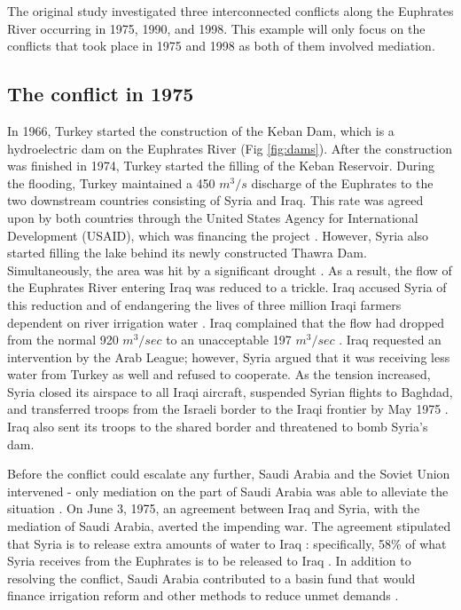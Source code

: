 \documentclass[letterpaper,12pt,titlepage,oneside,final]{book}
\begin{document}
The original study investigated three interconnected conflicts along the Euphrates River occurring in 1975, 1990, and 1998. This example will only focus on the conflicts that took place in 1975 and 1998 as both of them involved mediation. 

\subsection{The conflict in 1975}
In 1966, Turkey started the construction of the Keban Dam, which is a hydroelectric dam on the Euphrates River (Fig \ref{fig:dams}). After the construction was finished in 1974, Turkey started the filling of the Keban Reservoir. During the flooding, Turkey maintained a 450 $m^3/s$ discharge of the Euphrates to the two downstream countries consisting of Syria and Iraq. This rate was agreed upon by both countries through the United States Agency for International Development (USAID), which was financing the project \citep{inan2000law}. However, Syria also started filling the lake behind its newly constructed Thawra Dam. Simultaneously, the area was hit by a significant drought \citep{kalpakian2004identity}. As a result, the flow of the Euphrates River entering Iraq was reduced to a trickle. Iraq accused Syria of this reduction and of endangering the lives of three million Iraqi farmers dependent on river irrigation water \citep{morris1997water}. Iraq complained that the flow had dropped from the normal 920 $m^3/sec$ to an unacceptable 197 $m^3/sec$ \citep{priscoli2009managing}. Iraq requested an intervention by the Arab League; however, Syria argued that it was receiving less water from Turkey as well and refused to cooperate. As the tension increased, Syria closed its airspace to all Iraqi aircraft, suspended Syrian flights to Baghdad, and transferred troops from the Israeli border to the Iraqi frontier by May 1975 \citep{morris1997water}. Iraq also sent its troops to the shared border and threatened to bomb Syria's dam. 

Before the conflict could escalate any further, Saudi Arabia and the Soviet Union intervened - only mediation on the part of Saudi Arabia was able to alleviate the situation \citep{priscoli2009managing}. On June 3, 1975, an agreement between Iraq and Syria, with the mediation of Saudi Arabia, averted the impending war. The agreement stipulated that Syria is to release extra amounts of water to Iraq \citep{akanda2007tigris}: specifically, 58\% of what Syria receives from the Euphrates is to be released to Iraq \citep{priscoli2009managing}. In addition to resolving the conflict, Saudi Arabia contributed to a basin fund that would finance irrigation reform and other methods to reduce unmet demands \citep{akanda2007tigris}.
\end{document}
